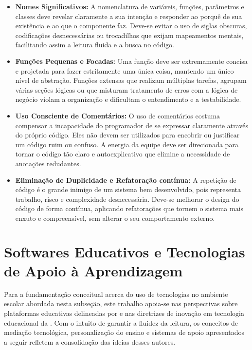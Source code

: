 \begin{itemize}
    \item \textbf{Nomes Significativos:} A nomenclatura de variáveis, funções, parâmetros e classes deve revelar claramente a sua intenção e responder ao porquê de sua existência e ao que o componente faz. Deve-se evitar o uso de siglas obscuras, codificações desnecessárias ou trocadilhos que exijam mapeamentos mentais, facilitando assim a leitura fluida e a busca no código. %

    \item \textbf{Funções Pequenas e Focadas:} Uma função deve ser extremamente concisa e projetada para fazer estritamente uma única coisa, mantendo um único nível de abstração. Funções extensas que realizam múltiplas tarefas, agrupam várias seções lógicas ou que misturam tratamento de erros com a lógica de negócio violam a organização e dificultam o entendimento e a testabilidade. %

    \item \textbf{Uso Consciente de Comentários:} O uso de comentários costuma compensar a incapacidade do programador de se expressar claramente através do próprio código. Eles não devem ser utilizados para encobrir ou justificar um código ruim ou confuso. A energia da equipe deve ser direcionada para tornar o código tão claro e autoexplicativo que elimine a necessidade de anotações redudantes. %

    \item \textbf{Eliminação de Duplicidade e Refatoração contínua:} A repetição de código é o grande inimigo de um sistema bem desenvolvido, pois representa trabalho, risco e complexidade desnecessária. Deve-se melhorar o design do código de forma contínua, aplicando refatorações que tornem o sistema mais enxuto e compreensível, sem alterar o seu comportamento externo. %
\end{itemize}

\section{Softwares Educativos e Tecnologias de Apoio à Aprendizagem}

Para a fundamentação conceitual acerca do uso de tecnologias no ambiente escolar abordada nesta subseção, este trabalho apoia-se nas perspectivas sobre plataformas educativas delineadas por  e nas diretrizes de inovação em tecnologia educacional da . Com o intuito de garantir a fluidez da leitura, os conceitos de mediação tecnológica, personalização do ensino e sistemas de apoio apresentados a seguir refletem a consolidação das ideias desses autores.

